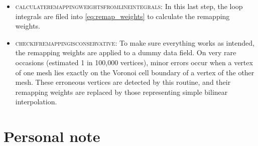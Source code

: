 \documentclass{article}
\begin{document}
\begin{itemize}
\item \textsc{calculate\textunderscore remapping\textunderscore weights\textunderscore from\textunderscore line\textunderscore integrals}: In this last step, the loop integrals are filed into \eqref{eq:remap_weights} to calculate the remapping weights.
\item \textsc{check\textunderscore if\textunderscore remapping\textunderscore is\textunderscore conservative}: To make sure everything works as intended, the remapping weights are applied to a dummy data field. On very rare occasions (estimated 1 in 100,000 vertices), minor errors occur when a vertex of one mesh lies exactly on the Voronoi cell boundary of a vertex of the other mesh. These erroneous vertices are detected by this routine, and their remapping weights are replaced by those representing simple bilinear interpolation.
\end{itemize}


\newpage
\section{Personal note}
\end{document}
